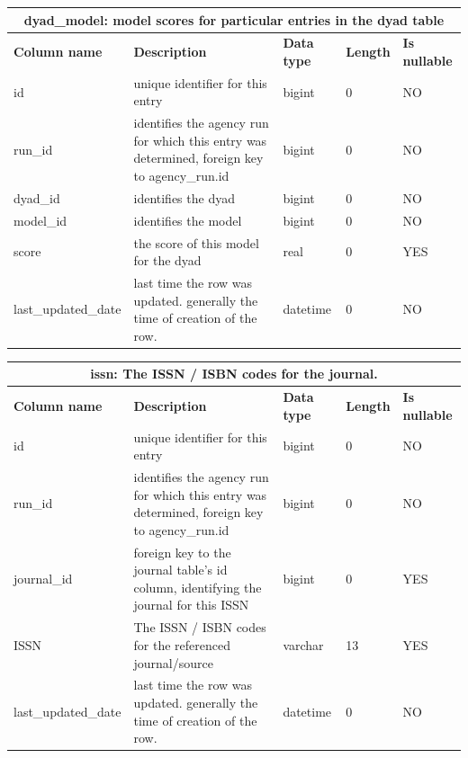 \documentclass[titlepage, 11pt]{article}
\begin{document}
{\begin{table}[h!]
{\begin{tabularx}{1\textwidth} {|p{3cm}|p{6.33cm}|p{2cm}|p{1.5cm}|p{1.5cm}|}
\end{tabularx}
\label{table: appendix b - dyads}
}
\end{table}

\begin{table}[h!]

{\renewcommand{\arraystretch}{1.5}%
\begin{tabularx}{1\textwidth} {|p{4cm}|p{5.33cm}|p{2cm}|p{1.5cm}|p{1.5cm}|}
 \hline
 \multicolumn{5}{|c|}{\textbf{dyad\_model: model scores for particular entries in the dyad table}}\\
 \hline
 \textbf{Column name} & \textbf{Description} & \textbf{Data type} & \textbf{Length} & \textbf{Is nullable} \\
 \hline
 id & unique identifier for this entry & bigint & 0 & NO \\
 \hline
 run\_id & identifies the agency run for which this entry was determined, foreign key to agency\_run.id & bigint   & 0 & NO \\
 \hline
 dyad\_id  & identifies the dyad & bigint & 0 & NO  \\
 \hline
 model\_id & identifies the model & bigint & 0 & NO  \\
 \hline
 score  & the score of this model for the dyad & real   & 0 & YES \\
 \hline
last\_updated\_date & last time the row was updated. generally the time of creation of the row.  & datetime & 0 & NO \\
\hline

\end{tabularx}
\label{table: appendix b - dyads models}
}
\end{table}

\begin{table}[h!]

{\renewcommand{\arraystretch}{1.5}%
\begin{tabularx}{1\textwidth} {|p{4cm}|p{5.33cm}|p{2cm}|p{1.5cm}|p{1.5cm}|}
 \hline
 \multicolumn{5}{|c|}{\textbf{issn: The ISSN / ISBN codes for the journal.}}\\
 \hline
 \textbf{Column name} & \textbf{Description} & \textbf{Data type} & \textbf{Length} & \textbf{Is nullable} \\
 \hline
 id & unique identifier for this entry & bigint   & 0  & NO  \\
 \hline
 run\_id & identifies the agency run for which this entry was determined, foreign key to agency\_run.id & bigint & 0 & NO \\
 \hline
 journal\_id  & foreign key to the journal table's id column, identifying the journal for this ISSN & bigint   & 0  & YES \\
\hline
ISSN & The ISSN / ISBN codes for the referenced journal/source & varchar  & 13 & YES \\
\hline
last\_updated\_date & last time the row was updated. generally the time of creation of the row. & datetime & 0  & NO \\
\hline


\end{tabularx}}
\end{table}}
\end{document}
